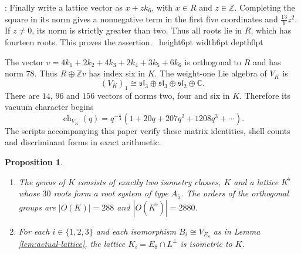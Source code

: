 \documentclass[leqno]{article}
\newcommand{\Cbb}{\ensuremath{\mathbb{C}}}
\newcommand{\Z}{\ensuremath{\mathbb{Z}}}
\newcommand{\qed}{\hfill \vrule height6pt  width6pt depth0pt}
\newtheorem{prop}[thm]{Proposition}
\newenvironment{proof}[1][]{\noindent {\it Proof #1} : }{\hbox{~}\qed
\smallskip
}
\numberwithin{equation}{section}
\begin{document}
\begin{proof}
Finally write a lattice vector as $x+zk_6$, with $x \in R$ and $z \in \Z$. Completing the square in its norm gives a nonnegative term in the first five coordinates and $\frac{13}{6}z^2$. If $z \neq 0$, its norm is strictly greater than two. Thus all roots lie in $R$, which has fourteen roots. This proves the assertion.
\end{proof}

The vector $v = 4k_1+2k_2+4k_3+2k_4+3k_5+6k_6$ is orthogonal to $R$ and has norm $78$. Thus $R \oplus \Z v$ has index six in $K$. The weight-one Lie algebra of $V_K$ is
\[
(V_K)_1 \cong \mathfrak{sl}_3 \oplus \mathfrak{sl}_3 \oplus \mathfrak{sl}_2 \oplus \Cbb.
\]
There are $14$, $96$ and $156$ vectors of norms two, four and six in $K$. Therefore its vacuum character begins
\[
\operatorname{ch}_{V_K}(q) = q^{-\frac{1}{4}}(1+20q+207q^2+1208q^3+\cdots).
\]
The scripts accompanying this paper verify these matrix identities, shell counts and discriminant forms in exact arithmetic.

\begin{prop}
\label{prop:genus-K}
\begin{enumerate}
\item The genus of $K$ consists of exactly two isometry classes, $K$ and a lattice $K^\flat$ whose $30$ roots form a root system of type $A_5$. The orders of the orthogonal groups are $|O(K)| = 288$ and $|O(K^\flat)| = 2880$.
\item For each $i \in \{1,2,3\}$ and each isomorphism $B_i \cong V_{E_8}$ as in Lemma \ref{lem:actual-lattice}, the lattice $K_i = E_8 \cap L^\perp$ is isometric to $K$.
\end{enumerate}
\end{prop}
\end{document}
